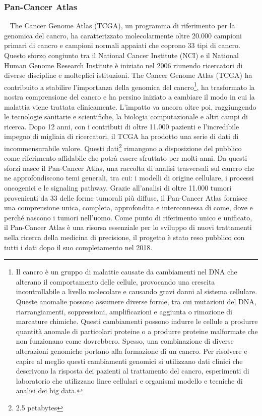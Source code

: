 \subsubsection{Pan-Cancer Atlas}~\newline
The Cancer Genome Atlas (TCGA), un programma di riferimento per la genomica del cancro, ha caratterizzato 
molecolarmente oltre 20.000 campioni primari di cancro e campioni normali appaiati che coprono 33 tipi di cancro. 
Questo sforzo congiunto tra il National Cancer Institute (NCI) e il National Human Genome Research Institute è 
iniziato nel 2006 riunendo ricercatori di diverse discipline e molteplici istituzioni. 
The Cancer Genome Atlas (TCGA) ha contribuito a stabilire l'importanza della genomica del cancro\footnote{Il cancro è 
un gruppo di malattie causate da cambiamenti nel DNA che alterano il comportamento delle cellule, provocando una
crescita incontrollabile a livello molecolare e causando gravi danni al sistema cellulare. Queste anomalie
possono assumere diverse forme, tra cui mutazioni del DNA, riarrangiamenti, soppressioni, amplificazioni e aggiunta 
o rimozione di marcature chimiche.
Questi cambiamenti possono indurre le cellule a produrre quantità anomale di particolari proteine o a produrre proteine
malformate che non funzionano come dovrebbero. Spesso, una combinazione di diverse alterazioni genomiche portano alla
formazione di un cancro. Per risolvere  e capire al meglio questi cambiamenti genomici si utilizzano dati clinici che
descrivono la risposta dei pazienti al trattamento del cancro, esperimenti di laboratorio che utilizzano linee cellulari
e organismi modello e tecniche di analisi dei big data.}, ha trasformato la nostra comprensione del cancro e ha persino
iniziato a cambiare il modo in cui la malattia viene trattata clinicamente. L'impatto va ancora oltre poi, raggiungendo
le tecnologie sanitarie e scientifiche, la biologia computazionale e altri campi di ricerca. Dopo 12 anni, con i
contributi di oltre 11.000 pazienti e l'incredibile impegno di migliaia di ricercatori, il TCGA ha prodotto una serie 
di dati di incommensurabile valore. Questi dati\footnote{2.5 petabytes} rimangono a disposizione del pubblico 
come riferimento affidabile che potrà essere sfruttato per molti anni. 
Da questi sforzi nasce il Pan-Cancer Atlas, una raccolta di analisi trasversali sul cancro che ne approfondiscono 
temi generali, tra cui: i modelli di origine cellulare, i processi oncogenici e le signaling pathway.
Grazie all'analisi di oltre 11.000 tumori provenienti da 33 delle forme tumorali più diffuse, il Pan-Cancer Atlas
fornisce una comprensione unica, completa, approfondita e interconnessa di come, dove e perché nascono i tumori
nell'uomo. Come punto di riferimento unico e unificato, il Pan-Cancer Atlas è una risorsa essenziale per lo sviluppo 
di nuovi trattamenti nella ricerca della medicina di precisione, il progetto è stato reso pubblico con
tutti i dati dopo il suo completamento nel 2018.

